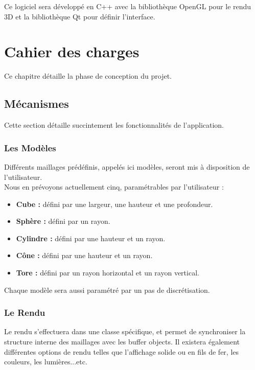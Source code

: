 \documentclass[a4paper]{memoir}
\begin{document}
			Ce logiciel sera développé en C++ avec la bibliothèque OpenGL pour le rendu 3D et la bibliothèque Qt pour définir l'interface.

	\chapter{Cahier des charges}
		Ce chapitre détaille la phase de conception du projet.
			
		\section{Mécanismes}
			Cette section détaille succintement les fonctionnalités de l'application.
			
			\subsection{Les Modèles}
				\label{model-cdc}
				Différents maillages prédéfinis, appelés ici modèles, seront mis à disposition de l'utilisateur.\\
				Nous en prévoyons actuellement cinq, paramétrables par l'utilisateur :
				\begin{itemize}
					\item \textbf{Cube :} défini par une largeur, une hauteur et une profondeur.
					\item \textbf{Sphère :} défini par un rayon.
					\item \textbf{Cylindre :} défini par une hauteur et un rayon.
					\item \textbf{Cône :} défini par une hauteur et un rayon.
					\item \textbf{Tore :} défini par un rayon horizontal et un rayon vertical.
				\end{itemize}
				Chaque modèle sera aussi paramétré par un pas de discrétisation.
				
			\subsection{Le Rendu}
				Le rendu s'effectuera dans une classe spécifique, et permet de synchroniser la structure interne des maillages avec les buffer objects. Il 
				existera également différentes options de rendu telles que l'affichage solide ou en fils de fer, les couleurs, les lumières...etc.
\end{document}
